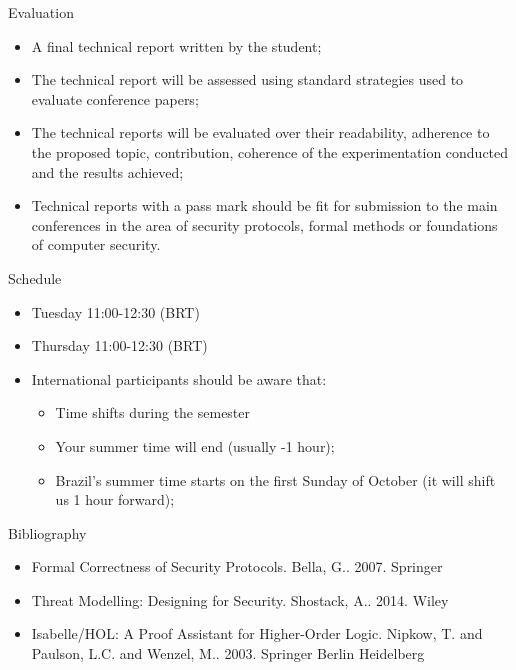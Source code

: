 \documentclass[12pt]{beamer}
\begin{document}
\begin{frame}{Evaluation}
\begin{itemize}
\item A final technical report written by the student;\pause
\item The technical report will be assessed using standard strategies used to evaluate conference papers;\pause
\item The technical reports will be evaluated over their readability, adherence to the
proposed topic, contribution, coherence of the experimentation conducted and the results achieved;\pause
\item Technical reports with a pass mark should be fit for submission to the main conferences in the area of security protocols, formal methods or foundations of computer security.
\end{itemize}
\end{frame}

\begin{frame}{Schedule}
\begin{itemize}
\item Tuesday 11:00-12:30 (BRT)
\item Thursday 11:00-12:30 (BRT)\pause
\item International participants should be aware that:
\begin{itemize}
\item Time shifts during the semester
\item Your summer time will end (usually -1 hour);
\item Brazil's summer time starts on the first Sunday of October (it will shift us 1 hour forward);
\end{itemize}
\end{itemize}
\end{frame}

\begin{frame}{Bibliography}
\begin{itemize}
\item Formal Correctness of Security Protocols. Bella, G.. 2007. Springer
\item Threat Modelling: Designing for Security. Shostack, A.. 2014. Wiley
\item Isabelle/HOL: A Proof Assistant for Higher-Order Logic. Nipkow, T. and Paulson, L.C. and Wenzel, M.. 2003. Springer Berlin Heidelberg
\end{itemize}
\end{frame}
\end{document}
